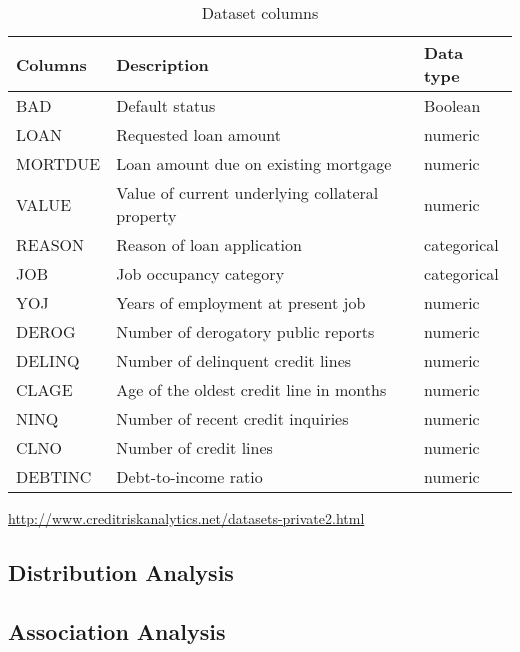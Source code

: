 \begin{table}[!htbp]
	\small
	\setlength{\tabcolsep}{8pt}
	\renewcommand{\arraystretch}{1.3}
	\begin{center}
		\caption[Dataset columns]{Dataset columns}\label{tab:values}
	\begin{tabular}{@{} l p{8cm} l @{}}
	\toprule
	\textbf{Columns} & \textbf{Description} & \textbf{Data type}\\
	\midrule
	BAD & Default status & Boolean \\
	\hline

	LOAN & Requested loan amount & numeric \\
	\hline
	MORTDUE & Loan amount due on existing mortgage & numeric \\
	\hline
	VALUE & Value of current underlying collateral property & numeric \\
	\hline
	REASON & Reason of loan application & categorical \\
	\hline
	JOB & Job occupancy category & categorical \\
	\hline
	YOJ & Years of employment at present job & numeric \\
	\hline
	DEROG & Number of derogatory public reports & numeric \\
	\hline
	DELINQ & Number of delinquent credit lines & numeric \\
	\hline
	CLAGE & Age of the oldest credit line in months & numeric \\
	\hline
	NINQ & Number of recent credit inquiries & numeric \\
	\hline
	CLNO & Number of credit lines & numeric \\
	\hline
	DEBTINC & Debt-to-income ratio & numeric \\
	\bottomrule
	\end{tabular}  
	\end{center}
	\begin{source} \url{http://www.creditriskanalytics.net/datasets-private2.html}\end{source}
\end{table}

\subsection{Distribution Analysis}
\subsection{Association Analysis}

